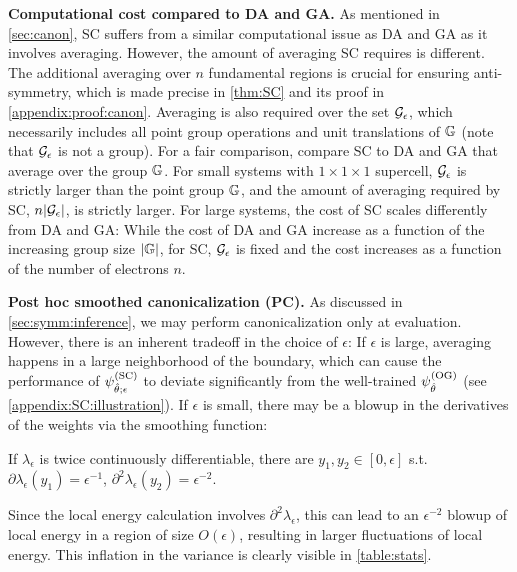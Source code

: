\noindent
\textbf{Computational cost compared to DA and GA.} As mentioned in \cref{sec:canon}, SC suffers from a similar computational issue as DA and GA as it involves averaging. However, the amount of averaging SC requires is different. The additional averaging over $n$ fundamental regions is crucial for ensuring anti-symmetry, which is made precise in \cref{thm:SC} and its proof in \cref{appendix:proof:canon}. Averaging is also required over the set $\mathcal{G}_\epsilon$, which necessarily includes all point group operations and unit translations of $\mathbb{G}$ (note that $\mathcal{G}_\epsilon$ is not a group). For a fair comparison, compare SC to DA and GA that average over the group $\mathbb{G}$. For small systems with $1 \times 1 \times 1$ supercell, $\mathcal{G}_\epsilon$ is strictly larger than the point group $\mathbb{G}$, and the amount of averaging required by SC, $n |\mathcal{G}_\epsilon|$, is strictly larger. For large systems, the cost of SC scales differently from DA and GA: While the cost of DA and GA increase as a function of the increasing group size $|\mathbb{G}|$, for SC, $\mathcal{G}_\epsilon$ is fixed and the cost increases as a function of the number of electrons $n$.

\vspace{.5em}

\noindent
\textbf{Post hoc smoothed canonicalization (PC).} As discussed in \cref{sec:symm:inference}, we may perform canonicalization only at evaluation. However, there is an inherent tradeoff in the choice of $\epsilon$: If $\epsilon$ is large, averaging happens in a large neighborhood of the boundary, which can cause the performance of $\psi^{(\rm SC)}_{\hat \theta;\epsilon}$ to deviate significantly from the well-trained $\psi^{(\rm OG)}_{\hat \theta}$ (see \cref{appendix:SC:illustration}). If $\epsilon$ is small, there may be a blowup in the derivatives of the weights via the smoothing function:



\begin{lemma} \label{lem:eps:lamb:blowup} If $\lambda_\epsilon$ is twice continuously differentiable, there are $y_1, y_2 \in [0, \epsilon]$ s.t.~$\partial \lambda_\epsilon(y_1) = \epsilon^{-1}$, $\partial^2 \lambda_\epsilon(y_2) = \epsilon^{-2}$.
\end{lemma}


Since the local energy calculation involves $\partial^2 \lambda_\epsilon$, this can lead to an $\epsilon^{-2}$ blowup of local energy in a region of size $O(\epsilon)$, resulting in larger fluctuations of local energy. This inflation in the variance is clearly visible in \cref{table:stats}.


